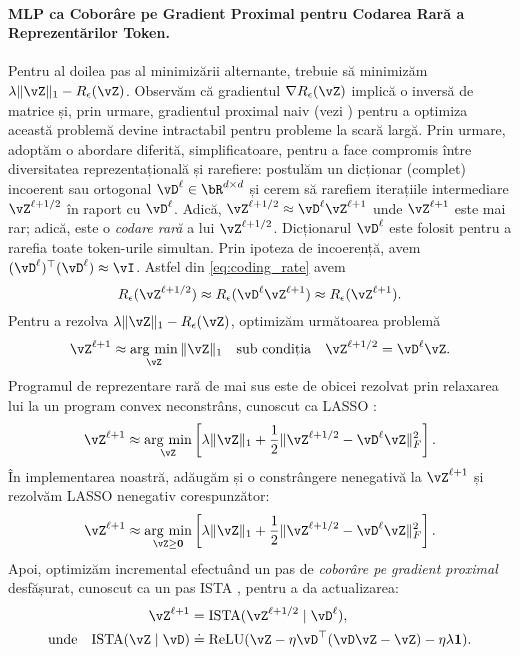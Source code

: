 \documentclass[../../book-main_ro.tex]{subfiles}
\begin{document}
\paragraph{MLP ca Coborâre pe Gradient Proximal pentru Codarea Rară a Reprezentărilor Token.} Pentru al doilea pas al minimizării alternante, trebuie să minimizăm $\lambda \norm{\vZ}_{1} - R_{\epsilon}(\vZ)$. Observăm că gradientul \(\nabla R_{\epsilon}(\vZ)\) implică o inversă de matrice și, prin urmare, gradientul proximal naiv (vezi ) pentru a optimiza această problemă devine intractabil pentru probleme la scară largă. %
Prin urmare, adoptăm o abordare diferită, simplificatoare, pentru a face compromis între diversitatea reprezentațională și rarefiere: postulăm un dicționar (complet) incoerent sau ortogonal $\vD^{\ell} \in \bR^{d \times d}$ și cerem să rarefiem iterațiile intermediare $\vZ^{\ell + 1/2}$ în raport cu \(\vD^{\ell}\). Adică, $\vZ^{\ell + 1/2} \approx \vD^{\ell} \vZ^{\ell + 1}$ unde $\vZ^{\ell + 1}$ este mai rar; adică, este o \textit{codare rară} a lui \(\vZ^{\ell + 1/2}\). Dicționarul \(\vD^{\ell}\) este folosit pentru a rarefia toate token-urile simultan.
Prin ipoteza de incoerență, avem $(\vD^{\ell})^\top(\vD^{\ell}) \approx \vI$. Astfel din \eqref{eq:coding_rate} avem
\begin{equation}
    R_{\epsilon}(\vZ^{\ell + 1/2}) \approx R_{\epsilon}(\vD^{\ell}\vZ^{\ell + 1}) \approx R_{\epsilon}(\vZ^{\ell + 1}).
\end{equation}
Pentru a rezolva $\lambda \norm{\vZ}_{1} - R_{\epsilon}(\vZ)$, optimizăm următoarea problemă
\begin{align*}
       \vZ^{\ell + 1} \approx \argmin_{\vZ}  \norm{\vZ}_1 \quad \mbox{sub condiția} \quad \vZ^{\ell + 1/2} = \vD^{\ell}\vZ.
\end{align*}
{Programul de reprezentare rară de mai sus este de obicei rezolvat prin relaxarea lui la un program convex neconstrâns, cunoscut ca LASSO \citep{Wright-Ma-2022}:}
\begin{equation}
    \vZ^{\ell + 1} \approx \argmin_{\vZ} \left[\lambda \norm{\vZ}_1 + \frac{1}{2}\norm{\vZ^{\ell + 1/2} - \vD^{\ell} \vZ}_F^2 \right].
\end{equation}
În implementarea noastră, adăugăm și o constrângere nenegativă la $\vZ^{\ell + 1}$ și rezolvăm LASSO nenegativ corespunzător:
\begin{equation}
    \vZ^{\ell + 1} \approx \argmin_{\vZ \geq \bm 0} \left[\lambda\norm{\vZ}_1 + \frac{1}{2}\norm{\vZ^{\ell + 1/2} - \vD^{\ell} \vZ}_{F}^{2}\right].
    \label{eq:sparse-nonnegative}
\end{equation}
Apoi, optimizăm incremental  efectuând un pas de {\em coborâre pe gradient proximal} desfășurat, cunoscut ca un pas ISTA \citep{beck2009fast}, pentru a da actualizarea:
\begin{align}\label{eq:ista-block}
    \vZ^{\ell + 1} 
    &= \mathrm{ISTA}({\vZ^{\ell + 1/2} \mid \vD^{\ell}}), \\
    \text{unde} \quad \mathrm{ISTA}({\vZ \mid \vD}) 
    &\doteq \operatorname{ReLU}(\vZ - \eta \vD^\top(\vD\vZ - \vZ) - \eta \lambda \bm{1}).
\end{align}
\end{document}
